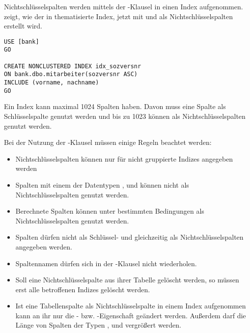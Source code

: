         Nichtschlüsselspalten werden mittels der -Klausel
        in einen Index aufgenommen.  zeigt, wie der in
         thematisierte Index, jetzt mit
         und  als Nichtschlüsselspalten
        erstellt wird.
        \begin{lstlisting}[language=ms_sql, caption={Ein Index mit
        Nichtschlüsselspalten}, label=admin05_11] 
USE [bank]
GO

CREATE NONCLUSTERED INDEX idx_sozversnr
ON bank.dbo.mitarbeiter(sozversnr ASC)
INCLUDE (vorname, nachname)
GO
        \end{lstlisting}
        \begin{merke}
          Ein Index kann maximal 1024 Spalten haben. Davon muss eine Spalte als
          Schlüsselspalte genutzt werden und bis zu 1023 können als
          Nichtschlüsselspalten genutzt werden.
        \end{merke}
        Bei der Nutzung der -Klausel müssen einige Regeln
        beachtet werden:
        \begin{itemize}
            \item Nichtschlüsselspalten können nur für nicht gruppierte Indizes
            angegeben werden
            \item Spalten mit einem der Datentypen ,
             und  können nicht als
            Nichtschlüsselspalten genutzt werden.
            \item Berechnete Spalten können unter bestimmten Bedingungen als
            Nichtschlüsselspalten genutzt werden.
            \item Spalten dürfen nicht als Schlüssel- und gleichzeitig als
            Nichtschlüsselspalten angegeben werden.
            \item Spaltennamen dürfen sich in der -Klausel
            nicht wiederholen.
            \item Soll eine Nichtschlüsselspalte aus ihrer Tabelle gelöscht
            werden, so müssen erst alle betroffenen Indizes gelöscht werden.
            \item Ist eine Tabellenspalte als Nichtschlüsselspalte in einem
            Index aufgenommen kann an ihr nur die - bzw.
            -Eigenschaft geändert werden. Außerdem darf
            die Länge von Spalten der Typen ,
             und  vergrößert werden.
        \end{itemize}
        \begin{literaturinternet}
          \item \cite{ms190806}
        \end{literaturinternet}
